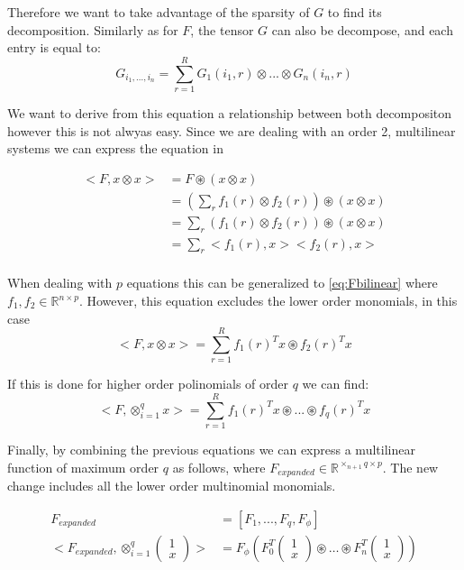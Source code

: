 \documentclass{article}
\begin{document}
Therefore we want to take advantage of the sparsity of $G$ to find its 
decomposition.
Similarly as for $F$, the tensor $G$ can also be decompose, and each entry is equal to:
\begin{equation}
    G_{i_1,...,i_n} = \sum_{r = 1}^R G_1(i_1,r)\otimes ...\otimes G_n(i_n,r) 
\end{equation}

We want to derive from this equation a relationship between 
both decompositon however this is not alwyas easy.
Since we are dealing with an order 2, multilinear systems
we can express the equation in 

\begin{align}
    <F, x \otimes x> &= F \circledast (x \otimes x) \\
    &= (\sum_r f_1(r) \otimes f_2(r) ) \circledast (x \otimes x) \\
    &= \sum_r( f_1(r) \otimes f_2(r) ) \circledast (x \otimes x) \\
    &= \sum_r <f_1(r), x> <f_2(r), x> \\
\end{align}

When dealing with $p$ equations this can be generalized to \ref{eq:Fbilinear}
where $f_1, f_2 \in \mathbb{R}^{n \times p}$. However, this equation excludes
the lower order monomials, in this case
\begin{equation}\label{eq:Fbilinear}
    <F, x \otimes x> = \sum_{r=1}^R f_1(r)^T x \circledast f_2(r)^T x 
\end{equation}

If this is done for higher order polinomials of order $q$ we can find:
\begin{equation}
    <F, \otimes_{i = 1}^{q} x > = \sum_{r=1}^R f_1(r)^T x \circledast ... \circledast f_q(r)^T x 
\end{equation}

Finally, by combining the previous equations we 
can express a multilinear function of maximum order $q$ as follows,
where $F_{expanded} \in \mathbb{R}^{\times_{n+1}q \times p}$. The new change
includes all the lower order multinomial monomials. 

\begin{align}\label{eq:fexpanded}
    F_{expanded} &= [F_1, ..., F_q, F_\phi]\\
    <F_{expanded}, \otimes_{i = 1}^{q}
    \begin{pmatrix}
        1 \\
        x
    \end{pmatrix}
    > &= F_\phi( F_0^T \begin{pmatrix}
        1 \\
        x
    \end{pmatrix} \circledast \dots \circledast
    F_n^T \begin{pmatrix}
        1 \\
        x
    \end{pmatrix})
\end{align}
\end{document}
